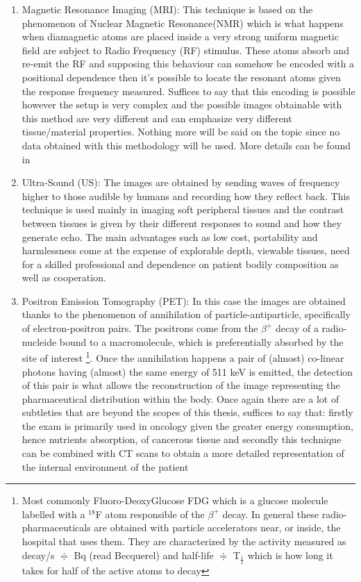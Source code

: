 \begin{enumerate}
\item Magnetic Resonance Imaging (MRI): This technique is based on the phenomenon of Nuclear Magnetic Resonance(NMR) which is what happens when diamagnetic atoms are placed inside a very strong uniform magnetic field are subject to Radio Frequency (RF) stimulus. These atoms absorb and re-emit the RF and supposing this behaviour can somehow be encoded with a positional dependence then it's possible to locate the resonant atoms given the response frequency measured. Suffices to say that this encoding is possible however the setup is very complex and the possible images obtainable with this method are very different and can emphasize very different tissue/material properties. Nothing more will be said on the topic since no data obtained with this methodology will be used. More details can be found in \cite{MRI}
\item Ultra-Sound (US): The images are obtained by sending waves of frequency higher to those audible by humans and recording how they reflect back. This technique is used mainly in imaging soft peripheral tissues and the contrast between tissues is given by their different responses to sound and how they generate echo. The main advantages such as low cost, portability and harmlessness come at the expense of explorable depth, viewable tissues, need for a skilled professional and dependence on patient bodily composition as well as cooperation.
\item Positron Emission Tomography (PET): In this case the images are obtained thanks to the phenomenon of annihilation of particle-antiparticle, specifically of electron-positron pairs.	The positrons come from the $\beta ^+$ decay of a radio-nucleide bound to a macromolecule, which is preferentially absorbed by the site of interest \footnote{Most commonly Fluoro-DeoxyGlucose FDG which is a glucose molecule labelled with a $^{18}$F atom responsible of the $\beta ^+$ decay. In general these radio-pharmaceuticals are obtained with particle accelerators near, or inside, the hospital that uses them. They are characterized by the activity measured as decay/s $\doteqdot$ Bq (read Becquerel) and half-life $\doteqdot$ T$_{\frac{1}{2}}$ which is how long it takes for half of the active atoms to decay}. Once the annihilation happens a pair of (almost) co-linear photons having (almost) the same energy of 511 keV is emitted, the detection of this pair is what allows the reconstruction of the image representing the pharmaceutical distribution within the body. Once again there are a lot of subtleties that are beyond the scopes of this thesis, suffices to say that: firstly the exam is primarily used in oncology given the greater energy consumption, hence nutrients absorption, of cancerous tissue and secondly this technique can be combined with CT scans to obtain a more detailed representation of the internal environment of the patient
\end{enumerate}


